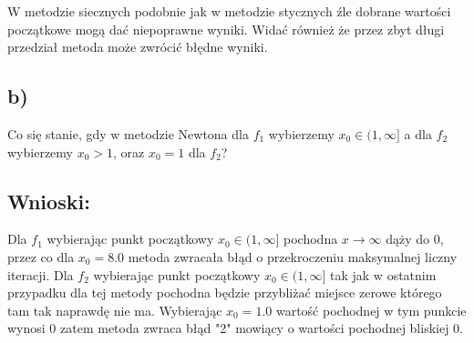 W metodzie siecznych podobnie jak w metodzie stycznych źle dobrane wartości początkowe mogą dać niepoprawne wyniki. Widać również że przez zbyt długi przedział metoda może zwrócić błędne wyniki.
\subsection{b)}
Co się stanie, gdy w metodzie Newtona dla \(f_1\) wybierzemy \(x_0 \in (1, \infty]\) a dla \(f_2\) wybierzemy \(x_0 > 1\), oraz \(x_0 = 1\) dla \(f_2\)?

\begin{table}[ht]
    \caption{wartości z wyjścia programu \textbf{zadanie6.jl}}

\end{table}

\subsection{Wnioski:}
Dla \(f_1\) wybierając punkt początkowy \(x_0 \in (1, \infty]\) pochodna \(x \to \infty\) dąży do 0, przez co dla \(x_0 = 8.0\) metoda zwracała błąd o przekroczeniu maksymalnej liczny iteracji.
Dla \(f_2\) wybierając punkt początkowy \(x_0 \in (1, \infty]\) tak jak w ostatnim przypadku dla tej metody pochodna będzie przybliżać miejsce zerowe którego tam tak naprawdę nie ma. Wybierając \(x_0 = 1.0\) wartość pochodnej w tym punkcie wynosi 0 zatem metoda zwraca błąd "2" mowiący o wartości pochodnej bliskiej 0.